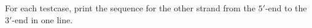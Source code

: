 For each testcase, print the sequence for the other strand from the $5'$-end to the $3'$-end in one line.
